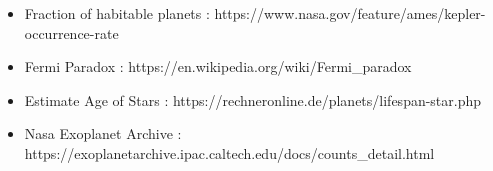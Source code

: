\documentclass{beamer}
\begin{document}
\begin{frame}
\begin{itemize}
    \item Fraction of habitable planets : \scriptsize{https://www.nasa.gov/feature/ames/kepler-occurrence-rate}
    \item Fermi Paradox : \scriptsize{https://en.wikipedia.org/wiki/Fermi\_paradox}
    \item Estimate Age of Stars : \scriptsize{https://rechneronline.de/planets/lifespan-star.php}
    \item Nasa Exoplanet Archive : \scriptsize{https://exoplanetarchive.ipac.caltech.edu/docs/counts\_detail.html}
\end{itemize}
\end{frame}
\end{document}
